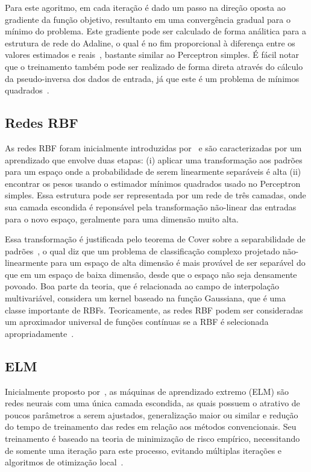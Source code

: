 \documentclass[conference]{IEEEtran}
\begin{document}
	Para este agoritmo, em cada iteração é dado um passo na direção oposta ao gradiente da função objetivo, resultanto em uma convergência gradual para o mínimo do problema. Este gradiente pode ser calculado de forma análitica para a estrutura de rede do Adaline, o qual é no fim proporcional à diferença entre os valores estimados e reais~\cite{widrow1960adaptive}, bastante similar ao Perceptron simples. É fácil notar que o treinamento também pode ser realizado de forma direta através do cálculo da pseudo-inversa dos dados de entrada, já que este é um problema de mínimos quadrados~\cite{haykin2007neural}.
	
	\subsection{Redes RBF}
	As redes RBF foram inicialmente introduzidas por~\cite{broomhead1988multivariablefi} e são caracterizadas por um aprendizado que envolve duas etapas: (i) aplicar uma transformação aos padrões para um espaço onde a probabilidade de serem linearmente separáveis é alta (ii) encontrar os pesos usando o estimador mínimos quadrados usado no Perceptron simples. Essa estrutura pode ser representada por um rede de três camadas, onde sua camada escondida é reponsável pela transformação não-linear das entradas para o novo espaço, geralmente para uma dimensão muito alta. 
	
	Essa transformação é justificada pelo teorema de Cover sobre a separabilidade de padrões~\cite{cover1965geometrical}, o qual diz que um problema de classificação complexo projetado não-linearmente para um espaço de alta dimensão é mais provável de ser separável do que em um espaço de baixa dimensão, desde que o espaço não seja densamente povoado. Boa parte da teoria, que é relacionada ao campo de interpolação multivariável, considera um kernel baseado na função Gaussiana, que é uma classe importante de RBFs. Teoricamente, as redes RBF podem ser consideradas um aproximador universal de funções contínuas se a RBF é selecionada apropriadamente~\cite{poggio1990networks, park1991universal, liao2003relaxed}.
	
	\subsection{ELM}	
	Inicialmente proposto por~\cite{huang2004extreme}, as máquinas de aprendizado extremo (ELM) são redes neurais com uma única camada escondida, as quais possuem o atrativo de poucos parâmetros a serem ajustados, generalização maior ou similar e redução do tempo de treinamento das redes em relação aos métodos convencionais. Seu treinamento é baseado na teoria de minimização de risco empírico, necessitando de somente uma iteração para este processo, evitando múltiplas iterações e algoritmos de otimização local~\cite{ding2015extreme}. 
	
\end{document}
